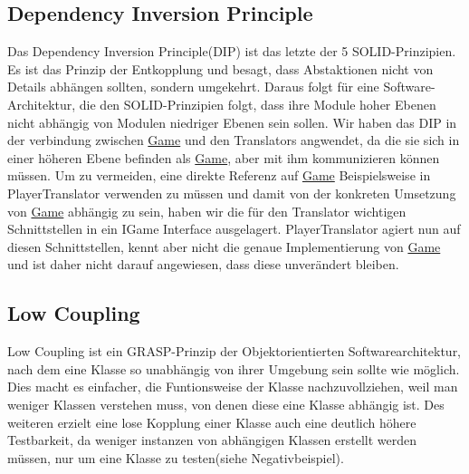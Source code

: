 \documentclass[
10pt, %
a4paper, %
oneside, %
headinclude,footinclude, %
BCOR5mm, %
]{scrartcl}
\begin{document}
\begin{onehalfspace}
\subsection{Dependency Inversion Principle}
\label{sec:depin}
Das Dependency Inversion Principle(DIP) ist das letzte der 5 SOLID-Prinzipien. Es ist das Prinzip der Entkopplung und besagt, dass Abstaktionen nicht von Details abhängen sollten, sondern umgekehrt. Daraus folgt für eine Software-Architektur, die den SOLID-Prinzipien folgt, dass ihre Module hoher Ebenen nicht abhängig von Modulen niedriger Ebenen sein sollen.
Wir haben das DIP in der verbindung zwischen \href{https://github.com/schmida736/Chess-AdvancedSE/blob/main/Chess-AdvancedSE/Game\%20Elements/Game.cs}{Game} und den Translators angwendet, da die sie sich in einer höheren Ebene befinden als \href{https://github.com/schmida736/Chess-AdvancedSE/blob/main/Chess-AdvancedSE/Game\%20Elements/Game.cs}{Game}, aber mit ihm kommunizieren können müssen.
Um zu vermeiden, eine direkte Referenz auf \href{https://github.com/schmida736/Chess-AdvancedSE/blob/main/Chess-AdvancedSE/Game\%20Elements/Game.cs}{Game} Beispielsweise in PlayerTranslator verwenden zu müssen und damit von der konkreten Umsetzung von \href{https://github.com/schmida736/Chess-AdvancedSE/blob/main/Chess-AdvancedSE/Game\%20Elements/Game.cs}{Game} abhängig zu sein, haben wir die für den Translator wichtigen Schnittstellen in ein IGame Interface ausgelagert. PlayerTranslator agiert nun auf diesen Schnittstellen, kennt aber nicht die genaue Implementierung von \href{https://github.com/schmida736/Chess-AdvancedSE/blob/main/Chess-AdvancedSE/Game\%20Elements/Game.cs}{Game} und ist daher nicht darauf angewiesen, dass diese unverändert bleiben.
\subsection{Low Coupling}
Low Coupling ist ein GRASP-Prinzip der Objektorientierten Softwarearchitektur, nach dem eine Klasse so unabhängig von ihrer Umgebung sein sollte wie möglich. Dies macht es einfacher, die Funtionsweise der Klasse nachzuvollziehen, weil man weniger Klassen verstehen muss, von denen diese eine Klasse abhängig ist. Des weiteren erzielt eine lose Kopplung einer Klasse auch eine deutlich höhere Testbarkeit, da weniger instanzen von abhängigen Klassen erstellt werden müssen, nur um eine Klasse zu testen(siehe Negativbeispiel).


\end{onehalfspace}
\end{document}
